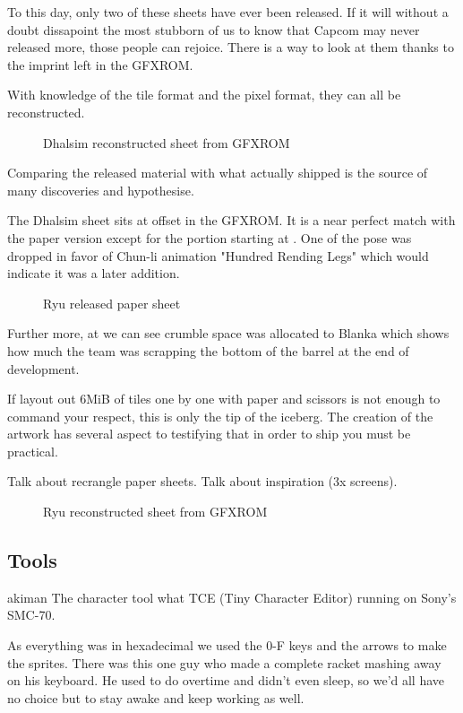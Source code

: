 To this day, only two of these sheets have ever been released\cite{fdasd}\cite{fs}. If it will without a doubt dissapoint the most stubborn of us to know that Capcom may never released more, those people can rejoice. There is a way to look at them thanks to the imprint left in the GFXROM. 

With knowledge of the tile format and the pixel format, they can all be reconstructed.




 \begin{figure}[H]
\caption*{Dhalsim reconstructed sheet from GFXROM}
\end{figure}

Comparing the released material with what actually shipped is the source of many discoveries and hypothesise. 


The Dhalsim sheet sits at offset  in the GFXROM. It is a near perfect match with the paper version except for the portion starting at . One of the pose was dropped in favor of Chun-li animation "Hundred Rending Legs" which would indicate it was a later addition. 

 \begin{figure}[H]
\caption*{Ryu released paper sheet}
\end{figure}

Further more, at  we can see crumble space was allocated to Blanka which shows how much the team was scrapping the bottom of the barrel at the end of development.

If layout out 6MiB of tiles one by one with paper and scissors is not enough to command your respect, this is only the tip of the iceberg. The creation of the artwork has several aspect to testifying that in order to ship you must be practical.

Talk about recrangle paper sheets.
Talk about inspiration (3x screens).

 \begin{figure}[H]
\caption*{Ryu reconstructed sheet from GFXROM}
\end{figure}


\subsection{Tools}



\begin{q}{akiman\cite{ar20160404}}
The character tool what TCE (Tiny Character Editor) running on Sony's SMC-70.

  As everything was in hexadecimal we used the 0-F keys and the arrows to make the sprites. There was this one guy who made a complete racket mashing away on his keyboard. He used to do overtime and didn't even sleep, so we'd all have no choice but to stay awake and keep working as well.
\end{q}


